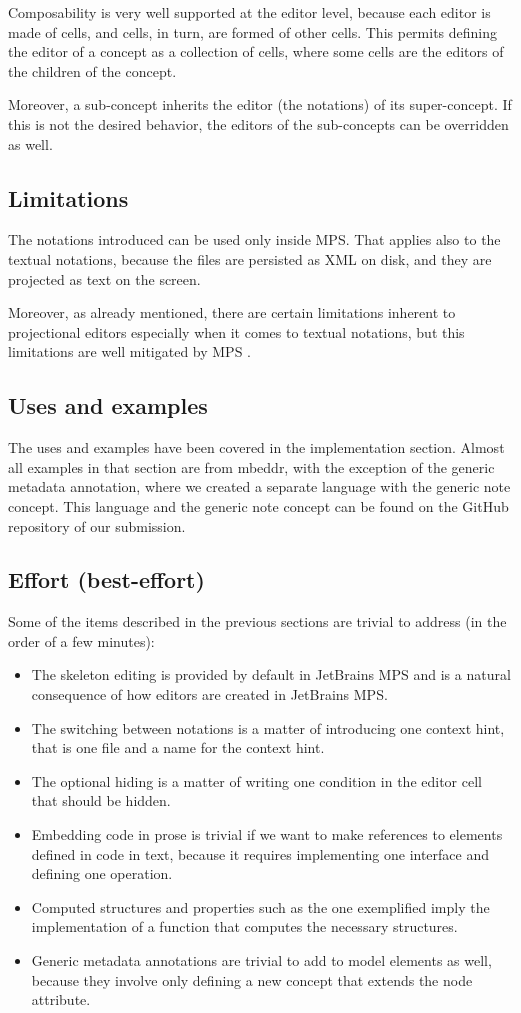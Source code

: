 \documentclass[preprint,numbers,10pt]{sigplanconf}
\begin{document}
Composability is very well supported at the editor level, because each editor is made of cells,
and cells, in turn, are formed of other cells. This permits defining
the editor of a concept as a collection of cells, where some cells are the editors of the children of the concept.

Moreover, a sub-concept inherits the editor (the notations) of its super-concept. If this is not the desired behavior,
the editors of the sub-concepts can be overridden as well.

\subsection{Limitations}
The notations introduced can be used only inside MPS. That applies also to the textual notations, because
the files are persisted as XML on disk, and they are projected as text on the screen.

Moreover, as already mentioned, there are certain limitations inherent to projectional editors especially
when it comes to textual notations, but this limitations are well mitigated by MPS \cite{voelter2014towards}.

\subsection{Uses and examples}
The uses and examples have been covered in the implementation section.
Almost all examples in that section are from mbeddr, with the exception of the generic metadata annotation,
where we created a separate language with the generic note concept. This language and the generic note concept
can be found on the GitHub repository of our submission.

\subsection{Effort (best-effort)}
Some of the items described in the previous sections are trivial to address (in the order of a few minutes):
\begin{itemize}
\item The skeleton editing is provided by default in JetBrains MPS and is a natural consequence
of how editors are created in JetBrains MPS.
\item The switching between notations is a matter of introducing one context hint, that is one file and a name for the
context hint.
\item The optional hiding is a matter of writing one condition in the editor cell
that should be hidden.
\item Embedding code in prose is trivial if we want to make references to elements defined in code in text, because
it requires implementing one interface and defining one operation.
\item Computed structures and properties such as the one exemplified imply the implementation of a function that computes the
necessary structures.
\item Generic metadata annotations are trivial to add to model elements as well, because they involve only defining a new
concept that extends the node attribute.
\end{itemize}
\end{document}
